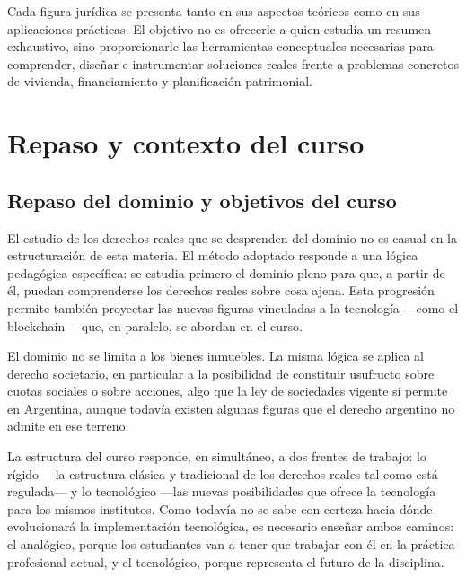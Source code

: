 \documentclass[12pt,oneside]{book}
\begin{document}
Cada figura jurídica se presenta tanto en sus aspectos teóricos como en sus aplicaciones prácticas. El objetivo no es ofrecerle a quien estudia un resumen exhaustivo, sino proporcionarle las herramientas conceptuales necesarias para comprender, diseñar e instrumentar soluciones reales frente a problemas concretos de vivienda, financiamiento y planificación patrimonial.


\chapter{Repaso y contexto del curso}

\section{Repaso del dominio y objetivos del curso}

El estudio de los derechos reales que se desprenden del dominio no es casual en la estructuración de esta materia. El método adoptado responde a una lógica pedagógica específica: se estudia primero el dominio pleno para que, a partir de él, puedan comprenderse los derechos reales sobre cosa ajena. Esta progresión permite también proyectar las nuevas figuras vinculadas a la tecnología ---como el blockchain--- que, en paralelo, se abordan en el curso.

\begin{important}
El dominio no se limita a los bienes inmuebles. La misma lógica se aplica al derecho societario, en particular a la posibilidad de constituir usufructo sobre cuotas sociales o sobre acciones, algo que la ley de sociedades vigente sí permite en Argentina, aunque todavía existen algunas figuras que el derecho argentino no admite en ese terreno.
\end{important}

La estructura del curso responde, en simultáneo, a dos frentes de trabajo: lo rígido ---la estructura clásica y tradicional de los derechos reales tal como está regulada--- y lo tecnológico ---las nuevas posibilidades que ofrece la tecnología para los mismos institutos. Como todavía no se sabe con certeza hacia dónde evolucionará la implementación tecnológica, es necesario enseñar ambos caminos: el analógico, porque los estudiantes van a tener que trabajar con él en la práctica profesional actual, y el tecnológico, porque representa el futuro de la disciplina.
\end{document}
